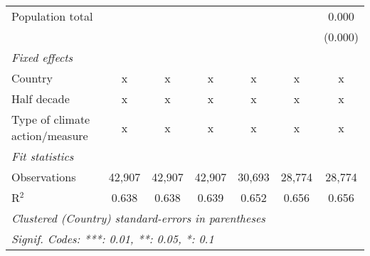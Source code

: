 \begin{tabular}{lcccccc}
   Population total                                                          &         &                &                &                &                & 0.000\\   
                                                                             &         &                &                &                &                & (0.000)\\   
   \emph{Fixed effects}\\
   Country                                                                   & x       & x              & x              & x              & x              & x\\  
   Half decade                                                               & x       & x              & x              & x              & x              & x\\  
   Type of climate action/measure                                            & x       & x              & x              & x              & x              & x\\  
   \midrule \emph{Fit statistics}\\
   Observations                                                              & 42,907  & 42,907         & 42,907         & 30,693         & 28,774         & 28,774\\  
   R$^2$                                                                     & 0.638   & 0.638          & 0.639          & 0.652          & 0.656          & 0.656\\  
   \midrule
   \multicolumn{7}{l}{\emph{Clustered (Country) standard-errors in parentheses}}\\
   \multicolumn{7}{l}{\emph{Signif. Codes: ***: 0.01, **: 0.05, *: 0.1}}\\
\end{tabular}
\par\endgroup


